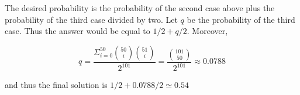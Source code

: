 \begin{solution}
The desired probability is the probability of the second case above plus the probability of the third case divided by two. Let $q$ be the probability of the third case. Thus the answer would be equal to $1/2 + q/2$. Moreover,

$$
q = \frac{\Sigma_{i=0}^{50}{50 \choose i}{51 \choose i}}{2^{101}} = \frac{{101 \choose 50}}{2^ {101}} \approx 0.0788
$$

and thus the final solution is $1/2 + 0.0788/2 \simeq 0.54$

\end{solution}